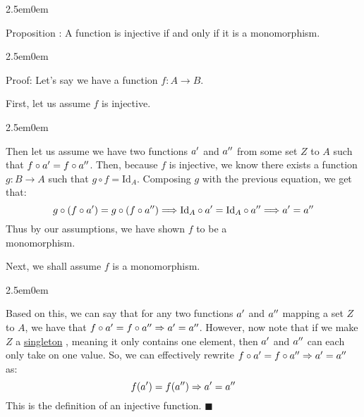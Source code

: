 \documentclass{book}
\newcommand{\hTwo}{%
   \color{MidnightBlue}%
   \fontsize{13}{13}%
}
\newcommand{\hThree}{%
   \color{PineGreen}
   \fontsize{13}{13}
}
\newenvironment{myIndent}{%
   \begin{adjustwidth}{2.5em}{0em}%
}{%
   \end{adjustwidth}%
}
\newcommand{\udefine}[1]{%
   \setulcolor{Red}%
   \setul{0.1ex}{0.15ex}%
   \ul{#1}%
}
\newcommand{\pprime}{\prime\prime}
\newcounter{PropNumber}
\newcommand{\propCount}{%
   \stepcounter{PropNumber}%
   \thePropNumber%
}
\begin{document}
   
   \begin{myIndent}
      \hTwo
      Proposition \propCount: A function is injective if and only if
      it is a monomorphism.

      \begin{myIndent}
         \hThree
         Proof: Let's say we have a function $f: A \rightarrow B$.
         \hfill \bigbreak

         First, let us assume $f$ is injective.
         
         \begin{myIndent}
            Then let us assume we have two functions $a\sp{\prime}$ 
            and $a\sp{\pprime}$ from some set $Z$ to $A$ such that 
            $f \circ a\sp{\prime} = f \circ a\sp{\pprime}$. Then, 
            because $f$ is injective, we know there exists a function
            $g: B \rightarrow A$ such that $g \circ f = \mathrm{Id}_A$.
            Composing $g$ with the previous equation, we get that:
            \[g\circ(f \circ a\sp{\prime}) = g \circ (f \circ 
            a\sp{\pprime}) \Longrightarrow \mathrm{Id}_A \circ a\sp{\prime}
            = \mathrm{Id}_A \circ a\sp{\pprime} \Longrightarrow 
            a\sp{\prime} = a\sp{\pprime}\]
            Thus by our assumptions, we have shown $f$ to be a\\
            monomorphism.
         \end{myIndent}
         \hfill \bigbreak

         Next, we shall assume $f$ is a monomorphism.

         \begin{myIndent}
            Based on this, we can say that for any two functions 
            $a\sp{\prime}$ and $a\sp{\pprime}$ mapping a set
            $Z$ to $A$, we have that $f \circ a\sp{\prime}
            = f \circ a\sp{\pprime} \Rightarrow a\sp{\prime} = 
            a\sp{\pprime}$. However, now note that if we make $Z$ a 
            \udefine{singleton}, meaning it only contains one element, 
            then $a\sp{\prime}$ and $a\sp{\pprime}$ can each
            only take on one value. So, we can effectively rewrite
            $f \circ a\sp{\prime} = f \circ a\sp{\pprime}
            \Rightarrow a\sp{\prime} = a\sp{\pprime}$ as:
            \[f(a\sp{\prime}) = f(a\sp{\pprime}) \Rightarrow 
            a\sp{\prime} = a\sp{\pprime}\]
            This is the definition of an injective function. $\blacksquare$
         \end{myIndent}
      \end{myIndent}
   \end{myIndent}
\end{document}
